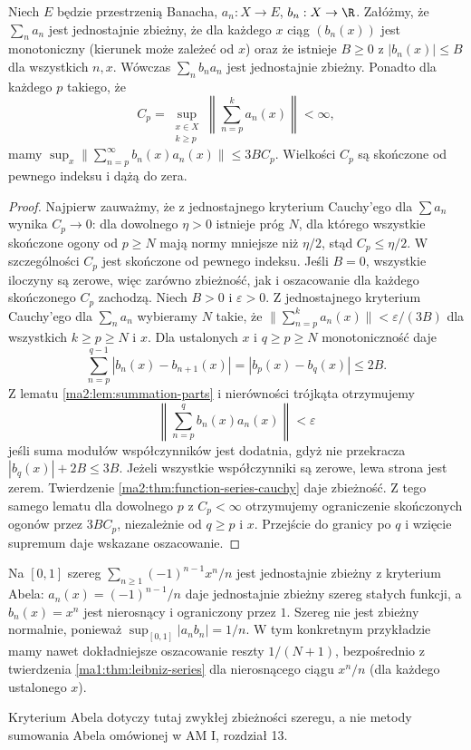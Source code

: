 \begin{twierdzenie}
\label{ma2:thm:uniform-abel}
Niech $E$ będzie przestrzenią Banacha,
$a_n:X\to E$, $b_n:X\to\R$.
Załóżmy, że $\sum_n a_n$ jest jednostajnie zbieżny,
że dla każdego $x$ ciąg $(b_n(x))$ jest monotoniczny
(kierunek może zależeć od $x$) oraz
że istnieje $B\ge0$ z $|b_n(x)|\le B$ dla
wszystkich $n,x$. Wówczas $\sum_n b_na_n$
jest jednostajnie zbieżny. Ponadto dla każdego
$p$ takiego, że
\[
 C_p=\sup_{\substack{x\in X\\k\ge p}}
       \left\|\sum_{n=p}^k a_n(x)\right\|<\infty,
\]
mamy $\sup_x\|\sum_{n=p}^\infty b_n(x)a_n(x)\|
\le3BC_p$. Wielkości $C_p$ są skończone od
pewnego indeksu i dążą do zera.
\end{twierdzenie}
\begin{proof}
Najpierw zauważmy, że z jednostajnego kryterium
Cauchy'ego dla $\sum a_n$ wynika $C_p\to0$:
dla dowolnego $\eta>0$ istnieje próg $N$, dla
którego wszystkie skończone ogony od $p\ge N$
mają normy mniejsze niż $\eta/2$, stąd
$C_p\le\eta/2$. W szczególności $C_p$ jest
skończone od pewnego indeksu.
Jeśli $B=0$, wszystkie iloczyny są zerowe,
więc zarówno zbieżność, jak i oszacowanie
dla każdego skończonego $C_p$ zachodzą.
Niech $B>0$ i $\varepsilon>0$.
Z jednostajnego kryterium Cauchy'ego dla
$\sum_n a_n$ wybieramy $N$ takie, że
$\|\sum_{n=p}^k a_n(x)\|<\varepsilon/(3B)$
dla wszystkich $k\ge p\ge N$ i $x$.
Dla ustalonych $x$ i $q\ge p\ge N$ monotoniczność
daje
\[
 \sum_{n=p}^{q-1}|b_n(x)-b_{n+1}(x)|
 =|b_p(x)-b_q(x)|\le2B.
\]
Z lematu \ref{ma2:lem:summation-parts}
i nierówności trójkąta otrzymujemy
\[
 \left\|\sum_{n=p}^q b_n(x)a_n(x)\right\|
 <\varepsilon
\]
jeśli suma modułów współczynników jest dodatnia,
gdyż nie przekracza $|b_q(x)|+2B\le3B$.
Jeżeli wszystkie współczynniki są zerowe,
lewa strona jest zerem. Twierdzenie
\ref{ma2:thm:function-series-cauchy} daje zbieżność.
Z tego samego lematu dla dowolnego $p$ z
$C_p<\infty$ otrzymujemy ograniczenie skończonych
ogonów przez $3BC_p$, niezależnie od $q\ge p$ i $x$.
Przejście do granicy po $q$ i wzięcie supremum
daje wskazane oszacowanie.
\end{proof}

\begin{przyklad}
\label{ma2:ex:abel-alternating-power}
Na $[0,1]$ szereg
$\sum_{n\ge1}(-1)^{n-1}x^n/n$ jest jednostajnie
zbieżny z kryterium Abela: $a_n(x)=(-1)^{n-1}/n$
daje jednostajnie zbieżny szereg stałych funkcji,
a $b_n(x)=x^n$ jest nierosnący i ograniczony przez $1$.
Szereg nie jest zbieżny normalnie, ponieważ
$\sup_{[0,1]}|a_n b_n|=1/n$. W tym konkretnym
przykładzie mamy nawet dokładniejsze oszacowanie
reszty $1/(N+1)$, bezpośrednio z twierdzenia
\ref{ma1:thm:leibniz-series} dla nierosnącego
ciągu $x^n/n$ (dla każdego ustalonego $x$).
\end{przyklad}
Kryterium Abela dotyczy tutaj zwykłej zbieżności
szeregu, a nie metody sumowania Abela omówionej
w AM I, rozdział 13.

